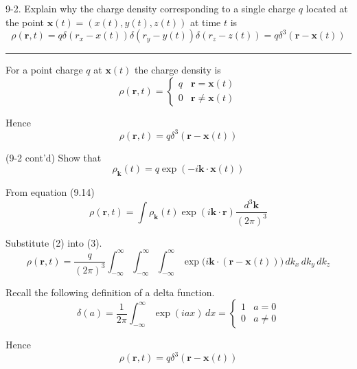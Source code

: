 \documentclass[12pt]{article}
\begin{document}
9-2.
Explain why the charge density corresponding to a single
charge $q$ located at the point $\mathbf x(t)=(x(t),y(t),z(t))$
at time $t$ is
\begin{equation*}
\rho(\mathbf r,t)=q
\delta(r_x-x(t))
\delta(r_y-y(t))
\delta(r_z-z(t))
=q\delta^3(\mathbf r-\mathbf x(t))
\end{equation*}

\bigskip
\hrule

\bigskip
For a point charge $q$ at $\mathbf x(t)$ the charge density is
\begin{equation*}
\rho(\mathbf r,t)
=\begin{cases}
q & \mathbf r=\mathbf x(t)
\\
0 & \mathbf r\ne\mathbf x(t)
\end{cases}
\end{equation*}

Hence
\begin{equation*}
\rho(\mathbf r,t)=q\delta^3(\mathbf r-\mathbf x(t))
\tag{1}
\end{equation*}

(9-2 cont'd)
Show that
\begin{equation*}
\rho_{\mathbf k}(t)=q\exp(-i\mathbf k\cdot\mathbf x(t))
\tag{2}
\end{equation*}

From equation (9.14)
\begin{equation*}
\rho(\mathbf r,t)=\int\rho_{\mathbf k}(t)
\exp(i\mathbf k\cdot\mathbf r)
\frac{d^3\mathbf k}{(2\pi)^3}
\tag{3}
\end{equation*}

Substitute (2) into (3).
\begin{equation*}
\rho(\mathbf r,t)=\frac{q}{(2\pi)^3}
\int_{-\infty}^\infty
\int_{-\infty}^\infty
\int_{-\infty}^\infty
\exp\big(i\mathbf k\cdot(\mathbf r-\mathbf x(t))\big)
\,dk_x\,dk_y\,dk_z
\end{equation*}

Recall the following definition of a delta function.
\begin{equation*}
\delta(a)=\frac{1}{2\pi}\int_{-\infty}^\infty\exp(iax)\,dx
=\begin{cases}
1 & a=0
\\
0 & a\ne0
\end{cases}
\end{equation*}

Hence
\begin{equation*}
\rho(\mathbf r,t)=q\delta^3(\mathbf r-\mathbf x(t))
\end{equation*}
\end{document}

